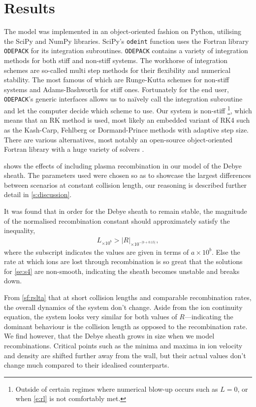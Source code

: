 \documentclass[aip,apl,reprint]{revtex4-1}
\begin{document}
	\section{Results}\label{s:results}	
	The model was implemented in an object-oriented fashion on Python, utilising the SciPy and NumPy libraries. SciPy's \texttt{odeint} function uses the Fortran library \texttt{ODEPACK} for its integration subroutines. \texttt{ODEPACK} contains a variety of integration methods for both stiff and non-stiff systems. The workhorse of integration schemes are so-called multi step methods for their flexibility and numerical stability. The most famous of which are Runge-Kutta schemes for non-stiff systems and Adams-Bashworth for stiff ones. Fortunately for the end user, \texttt{ODEPACK}'s generic interfaces allows us to na\"{i}vely call the integration subroutine and let the computer decide which scheme to use. Our system is non-stiff \footnote{Outside of certain regimes where numerical blow-up occurs such as $L=0$, or when \cref{e:rl} is not comfortably met.}, which means that an RK method is used, most likely an embedded variant of RK4 such as the Kash-Carp, Fehlberg or Dormand-Prince methods with adaptive step size. There are various alternatives, most notably an open-source object-oriented Fortran library with a huge variety of solvers \cite{foodie}.
	
	 shows the effects of including plasma recombination in our model of the Debye sheath. The parameters used were chosen so as to showcase the largest differences between scenarios at constant collision length, our reasoning is described further detail in \cref{s:discussion}.
	
	It was found that in order for the Debye sheath to remain stable, the magnitude of the normalised recombination constant should approximately satisfy the inequality,
	\begin{align}
		L_{\times 10^{b}} > |R|_{\times 10^{-|b+0.15|}},\label{e:rl}
	\end{align}
	where the subscript indicates the values are given in terms of $a \times 10^{b}$. Else the rate at which ions are lost through recombination is so great that the solutions for \cref{se:s4} are non-smooth, indicating the sheath becomes unstable and breaks down.
	
	From \cref{sf:rslta} that at short collision lengths and comparable recombination rates, the overall dynamics of the system don't change. Aside from the ion continuity equation, the system looks very similar for both values of $R$---indicating the dominant behaviour is the collision length as opposed to the recombination rate. We find however, that the Debye sheath grows in size when we model recombinations. Critical points such as the minima and maxima in ion velocity and density are shifted further away from the wall, but their actual values don't change much compared to their idealised counterparts.
	
\end{document}
